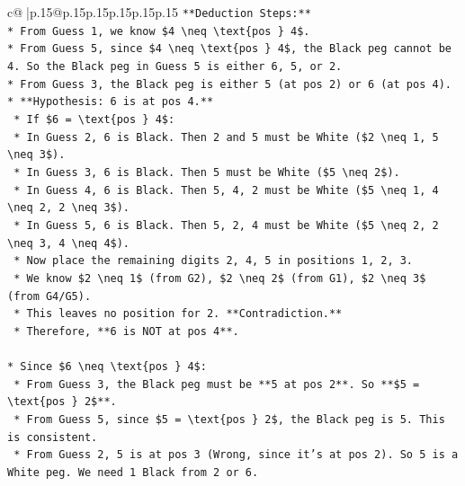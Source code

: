 \documentclass{article}
\begin{document}
{\begin{supertabular}{c@{$\;$}|p{.15\linewidth}@{}p{.15\linewidth}p{.15\linewidth}p{.15\linewidth}p{.15\linewidth}p{.15\linewidth}}
{{{\texttt{**Deduction Steps:**} \\
\texttt{*   From Guess 1, we know \$4 \textbackslash{}neq \textbackslash{}text\{pos \} 4\$.} \\
\texttt{*   From Guess 5, since \$4 \textbackslash{}neq \textbackslash{}text\{pos \} 4\$, the Black peg cannot be 4. So the Black peg in Guess 5 is either 6, 5, or 2.} \\
\texttt{*   From Guess 3, the Black peg is either 5 (at pos 2) or 6 (at pos 4).} \\
\texttt{*   **Hypothesis: 6 is at pos 4.**} \\
\texttt{    *   If \$6 = \textbackslash{}text\{pos \} 4\$:} \\
\texttt{        *   In Guess 2, 6 is Black. Then 2 and 5 must be White (\$2 \textbackslash{}neq 1, 5 \textbackslash{}neq 3\$).} \\
\texttt{        *   In Guess 3, 6 is Black. Then 5 must be White (\$5 \textbackslash{}neq 2\$).} \\
\texttt{        *   In Guess 4, 6 is Black. Then 5, 4, 2 must be White (\$5 \textbackslash{}neq 1, 4 \textbackslash{}neq 2, 2 \textbackslash{}neq 3\$).} \\
\texttt{        *   In Guess 5, 6 is Black. Then 5, 2, 4 must be White (\$5 \textbackslash{}neq 2, 2 \textbackslash{}neq 3, 4 \textbackslash{}neq 4\$).} \\
\texttt{        *   Now place the remaining digits 2, 4, 5 in positions 1, 2, 3.} \\
\texttt{        *   We know \$2 \textbackslash{}neq 1\$ (from G2), \$2 \textbackslash{}neq 2\$ (from G1), \$2 \textbackslash{}neq 3\$ (from G4/G5).} \\
\texttt{        *   This leaves no position for 2. **Contradiction.**} \\
\texttt{    *   Therefore, **6 is NOT at pos 4**.} \\
\\ 
\texttt{*   Since \$6 \textbackslash{}neq \textbackslash{}text\{pos \} 4\$:} \\
\texttt{    *   From Guess 3, the Black peg must be **5 at pos 2**. So **\$5 = \textbackslash{}text\{pos \} 2\$**.} \\
\texttt{    *   From Guess 5, since \$5 = \textbackslash{}text\{pos \} 2\$, the Black peg is 5. This is consistent.} \\
\texttt{    *   From Guess 2, 5 is at pos 3 (Wrong, since it's at pos 2). So 5 is a White peg. We need 1 Black from 2 or 6.} \\
}}}
\end{supertabular}}
\end{document}
